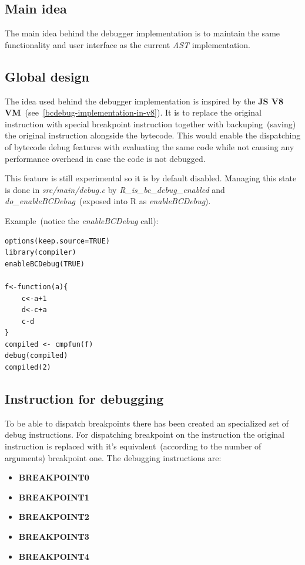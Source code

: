 \documentclass[thesis=M,english]{FITthesis}[2018/10/20]
\begin{document}
\subsection{Main idea}

The main idea behind the debugger implementation is to maintain the same functionality and user interface as the current \textit{AST} implementation.

\subsection{Global design}

The idea used behind the debugger implementation is inspired by the \textbf{JS V8 VM}~(see~\ref{bcdebug-implementation-in-v8}). It is to replace the original instruction with special breakpoint instruction together with backuping~(saving) the original instruction alongside the bytecode. This would enable the dispatching of bytecode debug features with evaluating the same code while not causing any performance overhead in case the code is not debugged.

This feature is still experimental so it is by default disabled. Managing this state is done in \textit{src/main/debug.c} by \textit{R{\_}is{\_}bc{\_}debug{\_}enabled} and \textit{do{\_}enableBCDebug}~(exposed into R as \textit{enableBCDebug}).

Example~(notice the \textit{enableBCDebug} call):
\begin{lstlisting}
options(keep.source=TRUE)
library(compiler)
enableBCDebug(TRUE)

f<-function(a){
    c<-a+1
    d<-c+a
    c-d
}
compiled <- cmpfun(f)
debug(compiled)
compiled(2)
\end{lstlisting}


\subsection{Instruction for debugging}\label{instruction-for-debugging}

To be able to dispatch breakpoints there has been created an specialized set of debug instructions. For dispatching breakpoint on the instruction the original instruction is replaced with it's equivalent~(according to the number of arguments) breakpoint one. The debugging instructions are:

\begin{itemize}
	\item \textbf{BREAKPOINT0}
	\item \textbf{BREAKPOINT1}
	\item \textbf{BREAKPOINT2}
	\item \textbf{BREAKPOINT3}
	\item \textbf{BREAKPOINT4}
\end{itemize}
\end{document}
